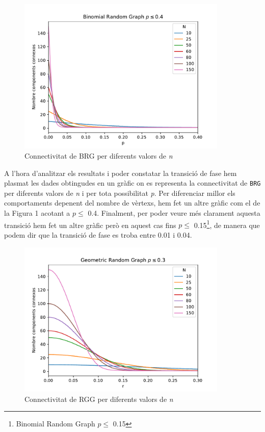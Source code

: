 
\begin{figure}[H]
    \centering
    \includegraphics[width=10cm]{plots/bin_mult_2_04.pdf}
    \caption{Connectivitat de BRG per diferents valors de \textit{n}}
    \label{fig:connect_04}
\end{figure}

A l'hora d'analitzar els resultats i poder constatar la transició de fase hem plasmat les dades obtingudes en un gràfic on es representa la connectivitat de \texttt{BRG} per diferents valors de \textit{n} i per tota possibilitat \textit{p}. Per diferenciar millor els comportaments depenent del nombre de vèrtexs, hem fet un altre gràfic com el de la Figura 1 acotant a $p\leq$ 0.4. Finalment, per poder veure més clarament aquesta transició hem fet un altre gràfic però en aquest cas fins $p\leq$ 0.15\footnote{Binomial Random Graph $p\leq$ 0.15}, de manera que podem dir que la transició de fase es troba entre 0.01 i 0.04.


\begin{figure}[H]
    \centering
    \includegraphics[width=10cm]{plots/geo_mult_2_03.pdf}
    \caption{Connectivitat de RGG per diferents valors de \textit{n}}
    \label{fig:connect_04}
\end{figure}

